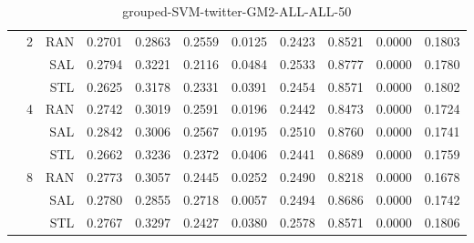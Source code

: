 \begin{center}
\begin{table}[htbp]
\begin{center}
\begin{tabular}{ | r | r | r | r | r | r | r | r | r | r | r |}
 & \multirow{3}{*}{2} & RAN & 0.2701 & 0.2863 & 0.2559 & 0.0125 & 0.2423 & 0.8521 & 0.0000 & 0.1803\\ \cline{3-11}
 &   & SAL & 0.2794 & 0.3221 & 0.2116 & 0.0484 & 0.2533 & 0.8777 & 0.0000 & 0.1780\\ \cline{3-11}
 &   & STL & 0.2625 & 0.3178 & 0.2331 & 0.0391 & 0.2454 & 0.8571 & 0.0000 & 0.1802\\ \cline{2-11}
 & \multirow{3}{*}{4} & RAN & 0.2742 & 0.3019 & 0.2591 & 0.0196 & 0.2442 & 0.8473 & 0.0000 & 0.1724\\ \cline{3-11}
 &   & SAL & 0.2842 & 0.3006 & 0.2567 & 0.0195 & 0.2510 & 0.8760 & 0.0000 & 0.1741\\ \cline{3-11}
 &   & STL & 0.2662 & 0.3236 & 0.2372 & 0.0406 & 0.2441 & 0.8689 & 0.0000 & 0.1759\\ \cline{2-11}
 & \multirow{3}{*}{8} & RAN & 0.2773 & 0.3057 & 0.2445 & 0.0252 & 0.2490 & 0.8218 & 0.0000 & 0.1678\\ \cline{3-11}
 &   & SAL & 0.2780 & 0.2855 & 0.2718 & 0.0057 & 0.2494 & 0.8686 & 0.0000 & 0.1742\\ \cline{3-11}
 &   & STL & 0.2767 & 0.3297 & 0.2427 & 0.0380 & 0.2578 & 0.8571 & 0.0000 & 0.1806\\ \cline{2-11}
\hline
\end{tabular}
\caption{grouped-SVM-twitter-GM2-ALL-ALL-50}
\end{center}
 \end{table}
\end{center}

